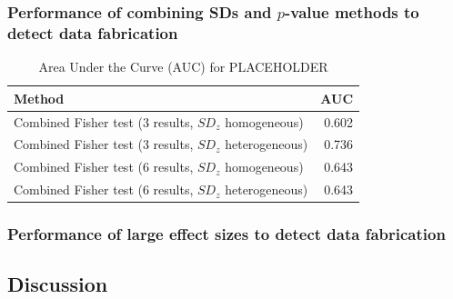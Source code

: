 \documentclass{article}
\begin{document}
\subsubsection*{Performance of combining SDs and $p$-value methods to detect data fabrication}


\begin{table}[ht]
\centering
\begin{tabular}{lr}
  \hline
Method & AUC \\ 
  \hline
Combined Fisher test (3 results, $SD_z$ homogeneous) & 0.602 \\ 
  Combined Fisher test (3 results, $SD_z$ heterogeneous) & 0.736 \\ 
  Combined Fisher test (6 results, $SD_z$ homogeneous) & 0.643 \\ 
  Combined Fisher test (6 results, $SD_z$ heterogeneous) & 0.643 \\ 
   \hline
\end{tabular}
\caption{Area Under the Curve (AUC) for PLACEHOLDER} 
\label{auc_combined}
\end{table}

\subsubsection*{Performance of large effect sizes to detect data fabrication}




\subsection*{Discussion}



\end{document}
